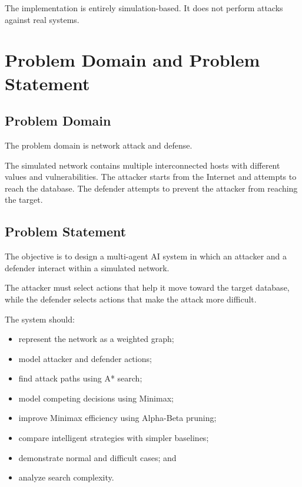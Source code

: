 \documentclass[12pt,a4paper]{article}
\begin{document}
The implementation is entirely simulation-based. It does not perform attacks
against real systems.


\section{Problem Domain and Problem Statement}

\subsection{Problem Domain}

The problem domain is network attack and defense.

The simulated network contains multiple interconnected hosts with different
values and vulnerabilities. The attacker starts from the Internet and attempts
to reach the database. The defender attempts to prevent the attacker from
reaching the target.

\subsection{Problem Statement}

The objective is to design a multi-agent AI system in which an attacker and a
defender interact within a simulated network.

The attacker must select actions that help it move toward the target database,
while the defender selects actions that make the attack more difficult.

The system should:

\begin{itemize}
    \item represent the network as a weighted graph;
    \item model attacker and defender actions;
    \item find attack paths using A* search;
    \item model competing decisions using Minimax;
    \item improve Minimax efficiency using Alpha-Beta pruning;
    \item compare intelligent strategies with simpler baselines;
    \item demonstrate normal and difficult cases; and
    \item analyze search complexity.
\end{itemize}
\end{document}
